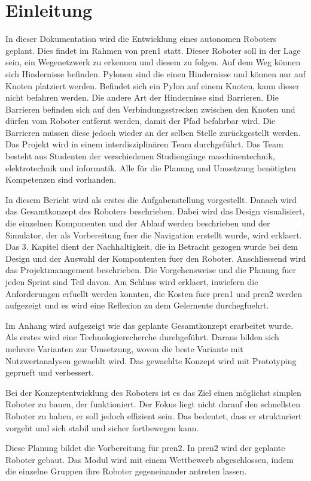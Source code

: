 \section{Einleitung}

In dieser Dokumentation wird die Entwicklung eines autonomen Roboters geplant. Dies findet im Rahmen von \acrfull{pren1} statt. Dieser Roboter soll in der Lage sein, ein Wegenetzwerk zu erkennen und diesem zu folgen. Auf dem Weg können sich Hindernisse befinden. Pylonen sind die einen Hindernisse und können nur auf Knoten platziert werden. Befindet sich ein Pylon auf einem Knoten, kann dieser nicht befahren werden. Die andere Art der Hindernisse sind Barrieren. Die Barrieren befinden sich auf den Verbindungsstrecken zwischen den Knoten und dürfen vom Roboter entfernt werden, damit der Pfad befahrbar wird. Die Barrieren müssen diese jedoch wieder an der selben Stelle zurückgestellt werden.
Das Projekt wird in einem interdisziplinären Team durchgeführt. Das Team besteht aus Studenten der verschiedenen Studiengänge \acrfull{maschinentechnik}, \acrfull{elektrotechnik} und \acrfull{informatik}. Alle für die Planung und Umsetzung benötigten Kompetenzen sind vorhanden.

In diesem Bericht wird als erstes die Aufgabenstellung vorgestellt. Danach wird das Gesamtkonzept des Roboters beschrieben. Dabei wird das Design visualisiert, die einzelnen Komponenten und der Ablauf werden beschrieben und der Simulator, der als Vorbereitung fuer die Navigation erstellt wurde, wird erklaert. Das 3. Kapitel dient der Nachhaltigkeit, die in Betracht gezogen wurde bei dem Design und der Auswahl der Kompontenten fuer den Roboter. Anschliessend wird das Projektmanagement beschrieben. Die Vorgehensweise und die Planung fuer jeden Sprint sind Teil davon.
Am Schluss wird erklaert, inwiefern die Anforderungen erfuellt werden konnten, die Kosten fuer \acrfull{pren1} und \acrfull{pren2} werden aufgezeigt und es wird eine Reflexion zu dem Gelernente durchegfuehrt.

Im Anhang wird aufgezeigt wie das geplante Gesamtkonzept erarbeitet wurde. Als erstes wird eine Technologierecherche durchgeführt. Daraus bilden sich mehrere Varianten zur Umsetzung, wovon die beste Variante mit Nutzwertanalysen gewaehlt wird. Das gewaehlte Konzept wird mit Prototyping geprueft und verbessert.

Bei der Konzeptentwicklung des Roboters ist es das Ziel einen möglichst simplen Roboter zu bauen, der funktioniert. Der Fokus liegt nicht darauf den schnellsten Roboter zu haben, er soll jedoch effizient sein. Das bedeutet, dass er strukturiert vorgeht und sich stabil und sicher fortbewegen kann.

Diese Planung bildet die Vorbereitung für \acrshort{pren2}. In \acrshort{pren2} wird der geplante Roboter gebaut. Das Modul wird mit einem Wettbewerb abgeschlossen, indem die einzelne Gruppen ihre Roboter gegeneinander antreten lassen.

